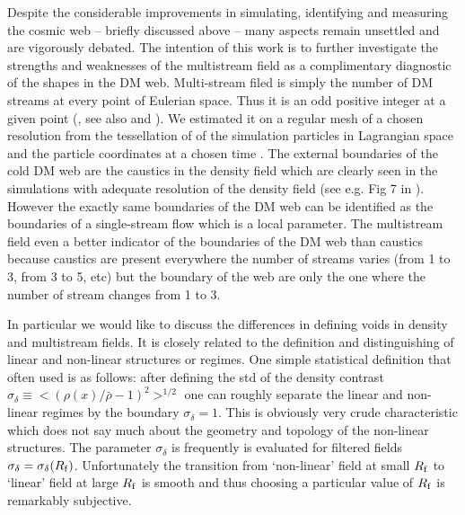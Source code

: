 \documentclass[fleqn,usenatbib,useAMS]{mnras}
\begin{document}

Despite the considerable improvements  in simulating, identifying and measuring the cosmic web 
-- briefly discussed above -- many aspects remain unsettled and are vigorously debated. 
The intention of this work is to further investigate the strengths and weaknesses of the multistream field as a complimentary diagnostic of the shapes in the DM web. 
Multi-stream filed is simply the number of DM streams at every point of Eulerian space.  Thus it is an odd positive integer at a given point (\citealt{Arnold1982}, see also \citealt{Shandarin1989} and \citealt{Hidding2014}). We estimated it  on a regular mesh of a chosen resolution from the tessellation of of the simulation particles in Lagrangian space and the particle coordinates at a chosen time \cite{Shandarin2012}.
The external boundaries of the cold DM web are the caustics in the density field which are clearly seen in
the simulations with adequate resolution of the density field (see e.g. Fig 7 in \citet{Hahn2015a}). However the exactly same boundaries of the DM web can be identified as the boundaries of a single-stream flow which is a local parameter. The multistream field even a better indicator of the boundaries of the DM web than caustics because caustics are present everywhere  the number of streams varies (from 1 to 3, from 3 to 5, etc) but the boundary of the web are only the one where the number of stream changes from 1 to 3.

In particular we would like to discuss the differences in defining voids in density and multistream fields. It is closely related to the definition and distinguishing of linear and non-linear structures or regimes. One simple statistical definition that often used  is as follows:  after defining the std of the density contrast $\sigma_{\delta} \equiv <(\rho(x)/ \bar{\rho} - 1)^2>^{1/2}$ one can roughly separate the linear and non-linear regimes by the boundary $\sigma_{\delta}=1$. This is obviously very crude characteristic which does not say much about the geometry and topology of the non-linear structures. The parameter $\sigma_{\delta}$ is frequently is evaluated for filtered fields $\sigma_{\delta} = \sigma_{\delta}(R_{\rm f})$. Unfortunately the transition from `non-linear'  field at small $R_{\rm f}$ to `linear' field at large  $R_{\rm f}$ is smooth and thus choosing a particular value of  $R_{\rm f}$ is remarkably subjective. 
\end{document}
